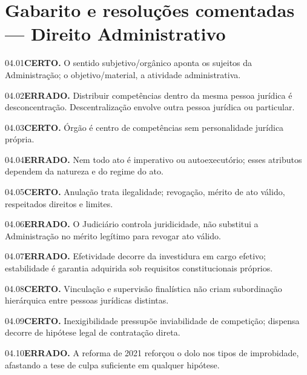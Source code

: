 \section{Gabarito e resoluções comentadas — Direito Administrativo}

\begin{solucao}{04.01}\textbf{CERTO.} O sentido subjetivo/orgânico aponta os sujeitos da Administração; o objetivo/material, a atividade administrativa.\end{solucao}
\begin{solucao}{04.02}\textbf{ERRADO.} Distribuir competências dentro da mesma pessoa jurídica é desconcentração. Descentralização envolve outra pessoa jurídica ou particular.\end{solucao}
\begin{solucao}{04.03}\textbf{CERTO.} Órgão é centro de competências sem personalidade jurídica própria.\end{solucao}
\begin{solucao}{04.04}\textbf{ERRADO.} Nem todo ato é imperativo ou autoexecutório; esses atributos dependem da natureza e do regime do ato.\end{solucao}
\begin{solucao}{04.05}\textbf{CERTO.} Anulação trata ilegalidade; revogação, mérito de ato válido, respeitados direitos e limites.\end{solucao}
\begin{solucao}{04.06}\textbf{ERRADO.} O Judiciário controla juridicidade, não substitui a Administração no mérito legítimo para revogar ato válido.\end{solucao}
\begin{solucao}{04.07}\textbf{ERRADO.} Efetividade decorre da investidura em cargo efetivo; estabilidade é garantia adquirida sob requisitos constitucionais próprios.\end{solucao}
\begin{solucao}{04.08}\textbf{CERTO.} Vinculação e supervisão finalística não criam subordinação hierárquica entre pessoas jurídicas distintas.\end{solucao}
\begin{solucao}{04.09}\textbf{CERTO.} Inexigibilidade pressupõe inviabilidade de competição; dispensa decorre de hipótese legal de contratação direta.\end{solucao}
\begin{solucao}{04.10}\textbf{ERRADO.} A reforma de 2021 reforçou o dolo nos tipos de improbidade, afastando a tese de culpa suficiente em qualquer hipótese.\end{solucao}

